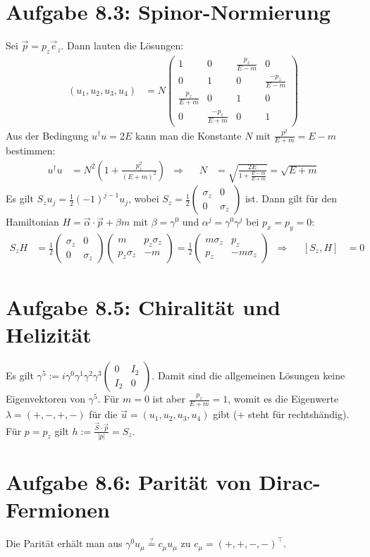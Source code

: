 \documentclass[a4paper,12pt]{article}
\newcommand{\kla}{}
\newcommand{\klam}{}
\begin{document}
\section*{Aufgabe 8.3: Spinor-Normierung}
Sei $\vec{p}=p_z\vec{e}_z$. Dann lauten die Lösungen:
\begin{align*}
(u_1,u_2,u_3,u_4)&=N\begin{pmatrix}
1&0&\frac{p_z}{E-m}&0\\
0&1&0&\frac{-p_z}{E-m}\\
\frac{p_z}{E+m}&0&1&0\\
0&\frac{-p_z}{E+m}&0&1
\end{pmatrix}
\end{align*}
Aus der Bedingung $u^\dagger u=2E$ kann man die Konstante $N$ mit $\frac{p^2}{E+m}=E-m$ bestimmen:
\begin{align*}
u^\dagger u&=N^2\kla\left( {1+\frac{p_z^2}{(E+m)^2}} \right)&\Rightarrow &&N&=\sqrt{\frac{2E}{1+\frac{E-m}{E+m}}}=\sqrt{E+m}
\end{align*}
Es gilt $S_zu_j=\frac{1}{2}(-1)^{j-1}u_j$, wobei $S_z=\frac{1}{2}\begin{pmatrix}
\sigma_z & 0\\ 0&\sigma_z
\end{pmatrix} $ ist. Dann gilt für den Hamiltonian $H=\vec{\alpha}\cdot\vec{p}+\beta m$ mit $\beta=\gamma^0$ und $\alpha^j=\gamma^0\gamma^j$ bei $p_x=p_y=0$:
\begin{align*}
S_zH&=\frac{1}{2}\begin{pmatrix}
\sigma_z & 0 \\ 0 & \sigma_z
\end{pmatrix}\begin{pmatrix}
m & p_z\sigma_z \\ 
p_z\sigma_z & -m
\end{pmatrix}=\frac{1}{2}\begin{pmatrix}
m\sigma_z & p_z \\ p_z & -m\sigma_z
\end{pmatrix}&\Rightarrow &&\klam\left[ {S_z,H} \right]&=0
\end{align*} 
\section*{Aufgabe 8.5: Chiralität und Helizität}
Es gilt $\gamma^5:=i\gamma^0\gamma^1\gamma^2\gamma^3\begin{pmatrix}
0&I_2 \\ I_2&0
\end{pmatrix} $. Damit sind die allgemeinen Lösungen keine Eigenvektoren von $\gamma^5$. Für $m=0$ ist aber $\frac{p_z}{E+m}=1$, womit es die Eigenwerte $\lambda=(+,-,+,-)$ für die $\vec{u}=(u_1,u_2,u_3,u_4)$ gibt ($+$ steht für rechtshändig). Für $p=p_z$ gilt $h:=\frac{\vec{S}\cdot\vec{p}}{|p|}=S_z$.
\section*{Aufgabe 8.6: Parität von Dirac-Fermionen}
Die Parität erhält man aus $\gamma^0u_\mu\overset{?}{=}c_\mu u_\mu$ zu $c_\mu = (+,+,-,-)^\top$. 
\end{document}
